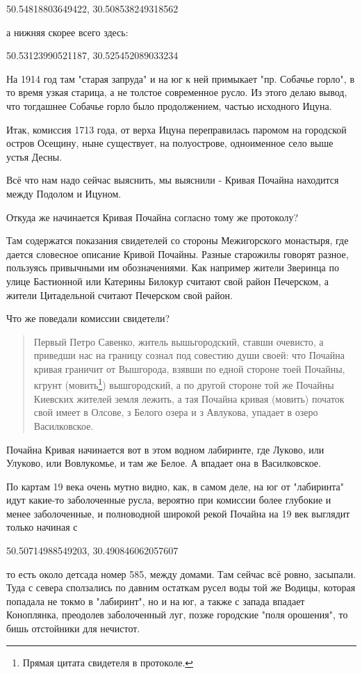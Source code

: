 50.54818803649422, 30.508538249318562

а нижняя скорее всего здесь:

50.53123990521187, 30.525452089033234

На 1914 год там "старая запруда" и на юг к ней примыкает "пр. Собачье горло", в то время узкая старица, а не толстое современное русло. Из этого делаю вывод, что тогдашнее Собачье горло было продолжением, частью исходного Ицуна.

Итак, комиссия 1713 года, от верха Ицуна переправилась паромом на городской остров Осещину, ныне существует, на полуострове,  одноименное село выше устья Десны.

Всё что нам надо сейчас выяснить, мы выяснили - Кривая Почайна находится между Подолом и Ицуном.  

Откуда же начинается Кривая Почайна согласно тому же протоколу?

Там содержатся показания свидетелей со стороны Межигорского монастыря, где дается словесное описание Кривой Почайны. Разные старожилы говорят разное, пользуясь привычными им обозначениями. Как например жители Зверинца по улице Бастионной или Катерины Билокур считают свой район Печерском, а жители Цитадельной считают Печерском свой район.

Что же поведали комиссии свидетели?

\begin{quotation}
Первый Петро Савенко, житель вышьгородский, ставши очевисто, а приведши нас на границу сознал под совестию души своей: что Почайна кривая граничит от Вышгорода, взявши по едной стороне тоей Почайны, кгрунт (мовить\footnote{Прямая цитата свидетеля в протоколе.}) вышгородский, а по другой стороне той же Почайны Киевских жителей земля лежить, а тая Почайна кривая (мовить) початок свой имеет в Олсове, з Белого озера и з Авлукова, упадает в озеро Василковское.
\end{quotation}
 
Почайна Кривая начинается вот в этом водном лабиринте, где Луково, или Улуково, или Вовлукомье, и там же Белое. А впадает она в Василковское.

По картам 19 века очень мутно видно, как, в самом деле, на юг от "лабиринта" идут какие-то заболоченные русла, вероятно при комиссии более глубокие и менее заболоченные, и полноводной широкой рекой Почайна на 19 век выглядит только начиная с 

50.50714988549203, 30.490846062057607

то есть около детсада номер 585, между домами. Там сейчас всё ровно, засыпали. Туда с севера сползались по давним остаткам русел воды той же Водицы, которая попадала не токмо в "лабиринт", но и на юг, а также с запада впадает Коноплянка, преодолев заболоченный луг, позже городские "поля орошения", то бишь отстойники для нечистот.

